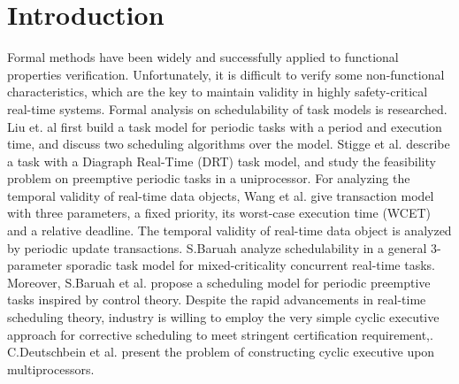 \documentclass[sigconf]{acmart}
\begin{document}




\maketitle

\section{Introduction}
Formal methods have been widely and successfully applied to functional properties verification. Unfortunately, it is difficult to verify some non-functional characteristics, which are the key to maintain validity in highly safety-critical real-time systems. Formal analysis on schedulability of task models is researched. Liu et. al \cite{DBLP:journals/jacm/LiuL73} first build a task model for periodic tasks with a period and execution time, and discuss two scheduling algorithms over the model. Stigge et al. \cite{DBLP:conf/rtas/StiggeEGY11} describe a task with a Diagraph Real-Time (DRT) task model, and study the feasibility problem on preemptive periodic tasks in a uniprocessor. For analyzing the temporal validity of real-time data objects, Wang et al. \cite{DBLP:journals/computing/WangLHSM13} give transaction model with three parameters, a fixed priority, its worst-case execution time (WCET) and a relative deadline. The temporal validity of real-time data object is  analyzed by periodic update transactions. S.Baruah \cite{DBLP:conf/rtss/Baruah16} analyze schedulability in a general 3-parameter sporadic task model \cite{DBLP:journals/csur/BurnsD17} for mixed-criticality concurrent real-time tasks. Moreover, S.Baruah et al. \cite{DBLP:conf/rtns/2017} propose a scheduling model for periodic preemptive tasks inspired by control theory. Despite the rapid advancements in real-time scheduling theory, industry is willing to employ the very simple cyclic executive approach \cite{DBLP:journals/rts/BakerS89} for corrective scheduling to meet stringent certification requirement,. C.Deutschbein et al. \cite{DBLP:conf/setta/2017} present the problem of constructing cyclic executive upon multiprocessors.
\end{document}
